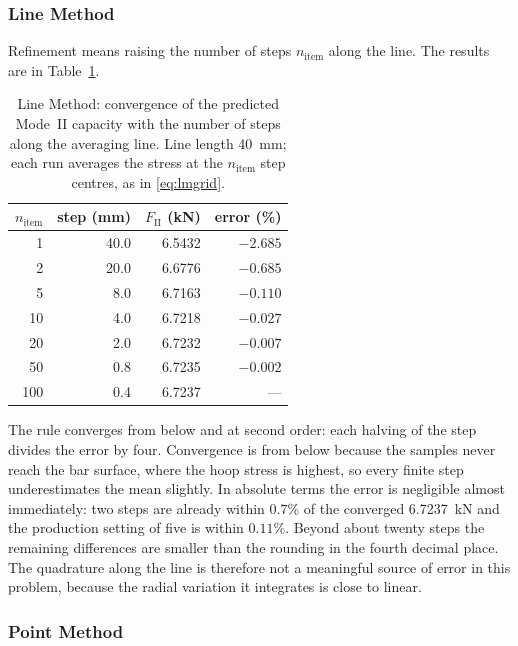 \subsubsection*{Line Method}
 
Refinement means raising the number of steps $n_{\mathrm{item}}$ along the
line. The results are in Table~\ref{tab:sensline}.
 
\begin{table}[htbp]
\centering
\caption{Line Method: convergence of the predicted Mode~II capacity with the
         number of steps along the averaging line. Line length
         \SI{40}{\milli\metre}; each run averages the stress at the
         $n_{\mathrm{item}}$ step centres, as in \eqref{eq:lmgrid}.}
\label{tab:sensline}
\begin{tabular}{rrrr}
\toprule
$n_{\mathrm{item}}$ & step (\si{\milli\metre})
  & $F_{\mathrm{II}}$ (\si{\kilo\newton}) & error (\si{\percent}) \\
\midrule
  1 & 40.0 & 6.5432 & $-2.685$ \\
  2 & 20.0 & 6.6776 & $-0.685$ \\
  5 &  8.0 & 6.7163 & $-0.110$ \\
 10 &  4.0 & 6.7218 & $-0.027$ \\
 20 &  2.0 & 6.7232 & $-0.007$ \\
 50 &  0.8 & 6.7235 & $-0.002$ \\
100 &  0.4 & 6.7237 & ---      \\
\bottomrule
\end{tabular}
\end{table}
 
The rule converges from below and at second order: each halving of the step
divides the error by four. Convergence is from below because the samples never reach the bar
surface, where the hoop stress is highest, so every finite step
underestimates the mean slightly. In absolute terms the error is negligible
almost immediately: two steps are already within $0.7\%$ of the converged
\SI{6.7237}{\kilo\newton} and the production setting of five is within
$0.11\%$. Beyond about twenty steps the remaining differences are smaller
than the rounding in the fourth decimal place. The quadrature along the line
is therefore not a meaningful source of error in this problem, because the
radial variation it integrates is close to linear.
 
\subsubsection*{Point Method}
 
